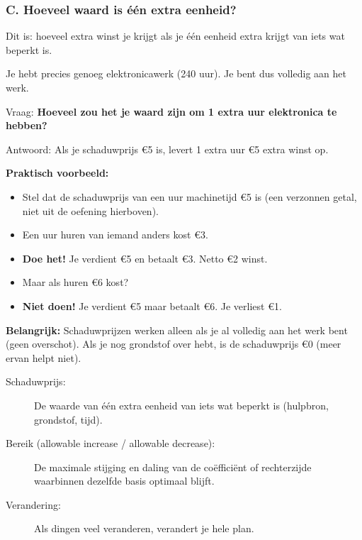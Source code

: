 \documentclass[a4paper,11pt]{article}
\begin{document}
\subsubsection{C. Hoeveel waard is één extra eenheid?}

\begin{theorieblok}
    Dit is: hoeveel extra winst je krijgt als je één eenheid extra krijgt van iets wat beperkt is.
\end{theorieblok}

Je hebt precies genoeg elektronicawerk (240 uur). Je bent dus volledig aan het werk.

Vraag: \textbf{Hoeveel zou het je waard zijn om 1 extra uur elektronica te hebben?}

Antwoord: Als je schaduwprijs €5 is, levert 1 extra uur €5 extra winst op.

\textbf{Praktisch voorbeeld:}
\begin{itemize}
    \item Stel dat de schaduwprijs van een uur machinetijd €5 is (een verzonnen getal, niet uit de oefening hierboven).
    \item Een uur huren van iemand anders kost €3.
    \item \textbf{Doe het!} Je verdient €5 en betaalt €3. Netto €2 winst.
    \item Maar als huren €6 kost?
    \item \textbf{Niet doen!} Je verdient €5 maar betaalt €6. Je verliest €1.
\end{itemize}

\textbf{Belangrijk:} Schaduwprijzen werken alleen als je al volledig aan het werk bent (geen overschot). Als je nog grondstof over hebt, is de schaduwprijs €0 (meer ervan helpt niet).

\begin{description}
    \item[Schaduwprijs:]
          De waarde van één extra eenheid van iets wat beperkt is (hulpbron, grondstof, tijd).
    \item[Bereik (allowable increase / allowable decrease):]
          De maximale stijging en daling van de coëfficiënt of rechterzijde waarbinnen dezelfde basis optimaal blijft.
    \item[Verandering:]
          Als dingen veel veranderen, verandert je hele plan.
\end{description}
\end{document}
